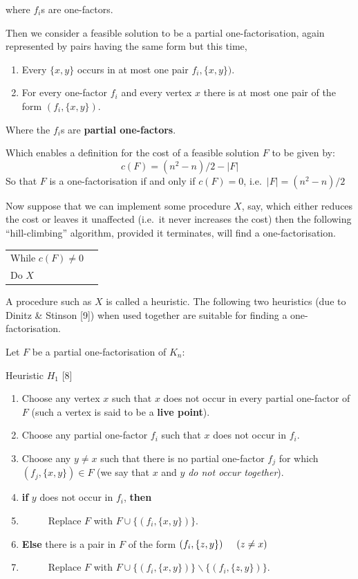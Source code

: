 \documentclass[
  12pt,
  a4paper]{book}
\begin{document}
where \(f_i\)s are one-factors.

Then we consider a feasible solution to be a partial one-factorisation,
again represented by pairs having the same form but this time,

\begin{enumerate}
\def\labelenumi{\arabic{enumi}.}
\item
  Every \(\{x,y\}\) occurs in at most one pair \(f_i,\{x,y\})\).
\item
  For every one-factor \(f_i\) and every vertex \(x\) there is at most
  one pair of the form \((f_i,\{x,y\})\).
\end{enumerate}

Where the \(f_i\)s are \textbf{partial one-factors}.

Which enables a definition for the cost of a feasible solution \(F\) to
be given by: \[c(F) = (n^2-n)/2-|F|\] So that \(F\) is a
one-factorisation if and only if \(c(F)=0\), i.e.~\(|F|=(n^2-n)/2\)

Now suppose that we can implement some procedure \(X\), say, which
either reduces the cost or leaves it unaffected (i.e.~it never increases
the cost) then the following ``hill-climbing'' algorithm, provided it
terminates, will find a one-factorisation.

\begin{longtable}[]{@{}ll@{}}
\toprule
\endhead
While \(c(F) \neq 0\) &\tabularnewline
Do \(X\) &\tabularnewline
\bottomrule
\end{longtable}

A procedure such as \(X\) is called a heuristic. The following two
heuristics (due to Dinitz \& Stinson {[}9{]}) when used together are
suitable for finding a one-factorisation.

Let \(F\) be a partial one-factorisation of \(K_n\):

Heuristic \(H_1\) {[}8{]}

\begin{enumerate}
\def\labelenumi{\arabic{enumi}.}
\item
  Choose any vertex \(x\) such that \(x\) does not occur in every
  partial one-factor of \(F\) (such a vertex is said to be a
  \textbf{live point}).
\item
  Choose any partial one-factor \(f_i\) such that \(x\) does not occur
  in \(f_i\).
\item
  Choose any \(y \neq x\) such that there is no partial one-factor
  \(f_j\) for which \((f_j,\{x,y\}) \in F\) (we say that \(x\) and \(y\)
  \emph{do not occur together}).
\item
  \textbf{if} \(y\) does not occur in \(f_i\), \textbf{then}
\item
  \(\hspace{1cm}\) Replace \(F\) with \(F \cup \{(f_i,\{x,y\})\}\).
\item
  \textbf{Else} there is a pair in \(F\) of the form
  \((f_i,\{z,y\}) \hspace{0.5cm} (z \neq x)\)
\item
  \(\hspace{1cm}\) Replace \(F\) with
  \(F \cup \{(f_i,\{x,y\})\} \backslash  \{(f_i,\{z,y\})\}\).
\end{enumerate}
\end{document}
